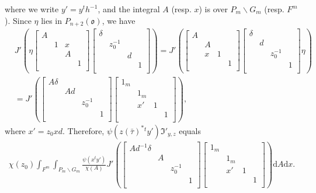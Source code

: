 \documentclass[11pt]{amsart}
\newcommand\oo{\mathfrak{o}}
\newcommand\If{\mathfrak{I}}
\newcommand\dr{\mathrm{d}}
\newcommand\1{\mathbf{1}}
\newcommand\bs{\backslash}%
\numberwithin{equation}{section}
\begin{document}
where we write $y' = y{}^th^{-1}$, and the integral $A$ (resp. $x$) is over $P_m \bs G_m$ (resp. $F^m$).
Since $\eta$ lies in $P_{n+2}(\oo)$, we have 
\begin{align*}
& J'(\eta\begin{bmatrix}
A & & &  \\
& 1 & x  & \\
&  &A &  \\
& & &1  \\
\end{bmatrix}
\begin{bmatrix}
\delta & & &  \\
&z_{0}^{-1} & & \\
& & d &  \\
& & &1  \\
\end{bmatrix}) = 
J'(\begin{bmatrix}
A & & &  \\
& A &  & \\
&  x &1 &  \\
& & &1  \\
\end{bmatrix}
\begin{bmatrix}
\delta & & &  \\
&d & & \\
& &z_{0}^{-1}&  \\
& & &1  \\
\end{bmatrix}\eta) \\
&= 
J'(\begin{bmatrix}
A \delta & & &  \\
& A d &   & \\
& &z_{0}^{-1} &  \\
& & &1  \\
\end{bmatrix}
\begin{bmatrix}
1_m & & &  \\
& 1_m & & \\
& x' & 1 &  \\
& & &1  \\
\end{bmatrix}),
\end{align*} 
where $x' = z_0x d$. 
Therefore, $\psi(z(\bar{\tau})^*{}^ty')\If'_{y,z}$ equals 
\begin{align*}
\chi(z_0)\int_{F^m}\int_{P_m \bs G_m} \frac{\psi(x{}^ty')}{\chi(A)} J'(\begin{bmatrix}
A d^{-1} \delta & & &  \\
& A&   & \\
&&z_{0}^{-1} &  \\
& & &1  \\
\end{bmatrix}
\begin{bmatrix}
1_m & & &  \\
& 1_m & & \\
& x' & 1 &  \\
& & &1  \\
\end{bmatrix}) \dr A \dr x.
\end{align*} 
\end{document}
